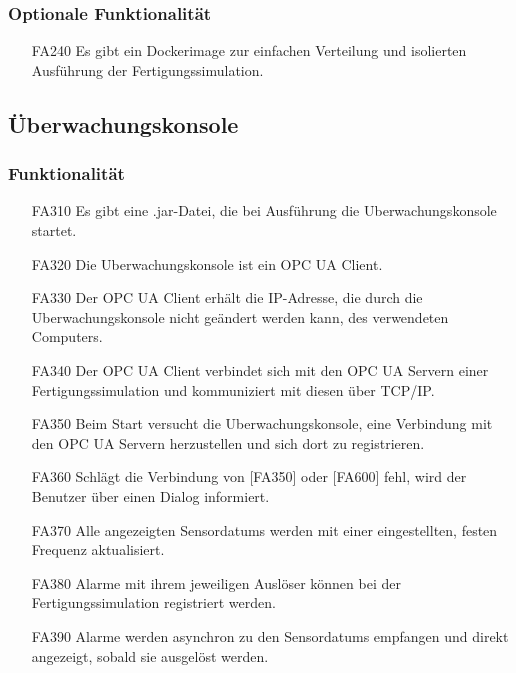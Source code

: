 \documentclass[parskip=full]{scrartcl}
\begin{document}
\subsubsection{Optionale Funktionalität}
\label{fertigung-optional}
\begin{enumerate}
\item[FA240] Es gibt ein \gls{Dockerimage} zur einfachen Verteilung und isolierten Ausführung der \gls{Fertigungssimulation}.
\end{enumerate}

\subsection{Überwachungskonsole}
\subsubsection{Funktionalität}
\begin{enumerate}
\item[FA310] Es gibt eine .jar-Datei, die bei Ausführung die \gls{Uberwachungskonsole} startet.
\item[FA320] Die \gls{Uberwachungskonsole} ist ein OPC UA Client.
\item[FA330] Der \gls{OPC UA} Client erhält die IP-Adresse, die durch die \gls{Uberwachungskonsole} nicht geändert werden kann, des verwendeten Computers.
\item[FA340] Der \gls{OPC UA} Client verbindet sich mit den \gls{OPC UA} Servern einer \gls{Fertigungssimulation} und kommuniziert mit diesen über \gls{TCP/IP}.
\item[FA350] Beim Start versucht die \gls{Uberwachungskonsole}, eine Verbindung mit den \gls{OPC UA} Servern herzustellen und sich dort zu registrieren.
\item[FA360] Schlägt die Verbindung von [FA350] oder [FA600] fehl, wird der Benutzer über einen Dialog informiert.
\item[FA370] Alle angezeigten \glspl{Sensordatum} werden mit einer eingestellten, festen Frequenz aktualisiert.
\item[FA380] Alarme mit ihrem jeweiligen Auslöser können bei der \gls{Fertigungssimulation} registriert werden.
\item[FA390] Alarme werden asynchron zu den \glspl{Sensordatum} empfangen und direkt angezeigt, sobald sie ausgelöst werden.
\end{enumerate}
\end{document}
